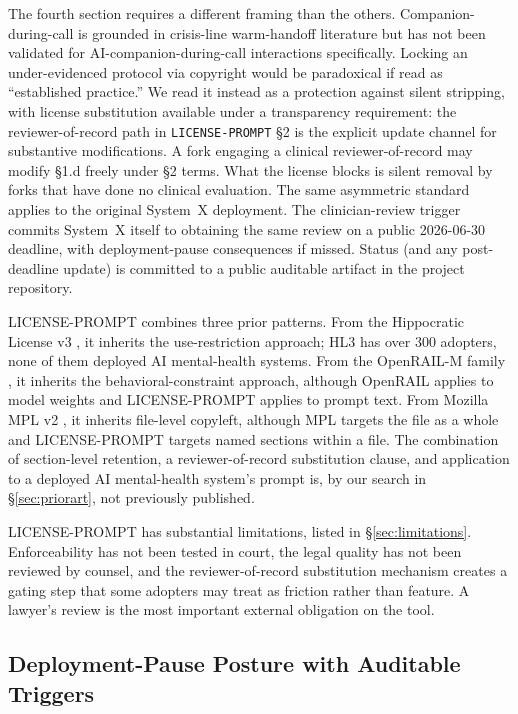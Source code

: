 \documentclass[letterpaper]{article} %
\begin{document}
The fourth section requires a different framing than the others. Companion-during-call is grounded in crisis-line warm-handoff literature \citep{gould2007hotline,mishara2008samaritans} but has not been validated for AI-companion-during-call interactions specifically. Locking an under-evidenced protocol via copyright would be paradoxical if read as ``established practice.'' We read it instead as a protection against silent stripping, with license substitution available under a transparency requirement: the reviewer-of-record path in \texttt{LICENSE-PROMPT} \S2 is the explicit update channel for substantive modifications. A fork engaging a clinical reviewer-of-record may modify \S1.d freely under \S2 terms. What the license blocks is silent removal by forks that have done no clinical evaluation. The same asymmetric standard applies to the original System~X deployment. The clinician-review trigger commits System~X itself to obtaining the same review on a public 2026-06-30 deadline, with deployment-pause consequences if missed. Status (and any post-deadline update) is committed to a public auditable artifact in the project repository.

LICENSE-PROMPT combines three prior patterns. From the Hippocratic License v3 \citep{hl3}, it inherits the use-restriction approach; HL3 has over 300 adopters, none of them deployed AI mental-health systems. From the OpenRAIL-M family \citep{openrail2022}, it inherits the behavioral-constraint approach, although OpenRAIL applies to model weights and LICENSE-PROMPT applies to prompt text. From Mozilla MPL v2 \citep{mpl2}, it inherits file-level copyleft, although MPL targets the file as a whole and LICENSE-PROMPT targets named sections within a file. The combination of section-level retention, a reviewer-of-record substitution clause, and application to a deployed AI mental-health system's prompt is, by our search in \S\ref{sec:priorart}, not previously published.

LICENSE-PROMPT has substantial limitations, listed in \S\ref{sec:limitations}. Enforceability has not been tested in court, the legal quality has not been reviewed by counsel, and the reviewer-of-record substitution mechanism creates a gating step that some adopters may treat as friction rather than feature. A lawyer's review is the most important external obligation on the tool.

\subsection{Deployment-Pause Posture with Auditable Triggers}
\label{sec:pause}
\end{document}
